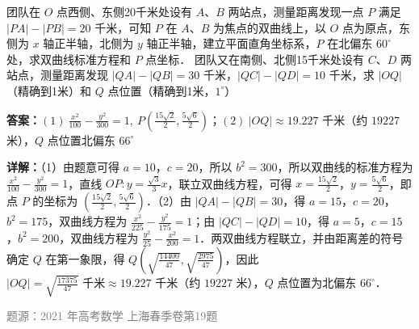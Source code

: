\begin{question}
团队在 $O$ 点西侧、东侧20千米处设有 $A$、$B$ 两站点，测量距离发现一点 $P$ 满足 $|PA|-|PB|=20$ 千米，可知 $P$ 在 $A$、$B$ 为焦点的双曲线上，以 $O$ 点为原点，东侧为 $x$ 轴正半轴，北侧为 $y$ 轴正半轴，建立平面直角坐标系，$P$ 在北偏东 $60^\circ$ 处，求双曲线标准方程和 $P$ 点坐标．
团队又在南侧、北侧15千米处设有 $C$、$D$ 两站点，测量距离发现 $|QA|-|QB|=30$ 千米，$|QC|-|QD|=10$ 千米，求 $|OQ|$（精确到1米）和 $Q$ 点位置（精确到1米，$1^\circ$）
\begin{solution}
\textbf{答案：}$(1)\ \frac{x^2}{100}-\frac{y^2}{300}=1,\ P(\frac{15\sqrt{2}}{2},\frac{5\sqrt{6}}{2})$；$(2)\ |OQ|\approx 19.227$ 千米（约 $19227$ 米），$Q$ 点位置北偏东 $66^\circ$

\textbf{详解：}（1）由题意可得 $a=10$，$c=20$，所以 $b^2=300$，所以双曲线的标准方程为 $\frac{x^2}{100}-\frac{y^2}{300}=1$，直线 $OP:y=\frac{\sqrt{3}}{3}x$，联立双曲线方程，可得 $x=\frac{15\sqrt{2}}{2}$，$y=\frac{5\sqrt{6}}{2}$，即点 $P$ 的坐标为 $(\frac{15\sqrt{2}}{2},\frac{5\sqrt{6}}{2})$．\newline（2）由 $|QA|-|QB|=30$，得 $a=15$，$c=20$，$b^2=175$，双曲线方程为 $\frac{x^2}{225}-\frac{y^2}{175}=1$；由 $|QC|-|QD|=10$，得 $a=5$，$c=15$，$b^2=200$，双曲线方程为 $\frac{y^2}{25}-\frac{x^2}{200}=1$．两双曲线方程联立，并由距离差的符号确定 $Q$ 在第一象限，得 $Q\left(\sqrt{\frac{14400}{47}},\sqrt{\frac{2975}{47}}\right)$，因此 $|OQ|=\sqrt{\frac{17375}{47}}\text{ 千米}\approx19.227\text{ 千米}$（约 $19227$ 米），$Q$ 点位置为北偏东 $66^\circ$．

\textcolor{gray}{\footnotesize 题源：2021 年高考数学 上海春季卷第19题}
\end{solution}
\end{question}

